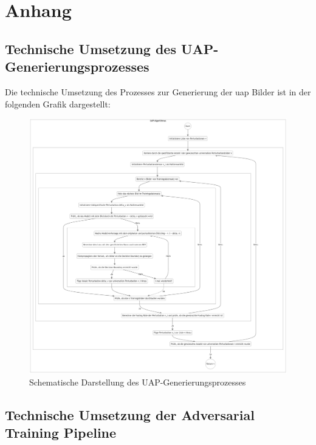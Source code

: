 \section*{Anhang}

\subsection*{Technische Umsetzung des UAP-Generierungsprozesses}

Die technische Umsetzung des Prozesses zur Generierung der \acrshort{uap} Bilder ist in der folgenden Grafik dargestellt:

\begin{figure}[H]
    \centering
    \includegraphics[width=\linewidth]{01-images/04-methodik/UAP_ALG.png}
    \caption{Schematische Darstellung des UAP-Generierungsprozesses}
    \label{fig:05-uap_algorithm}
\end{figure}

\newpage

\subsection*{Technische Umsetzung der Adversarial Training Pipeline}


